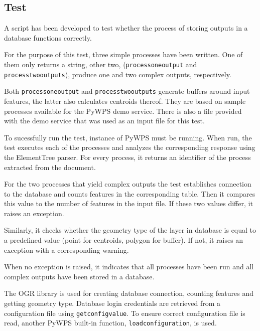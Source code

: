 \subsection{Test} 

A script has been developed to test whether the process of storing outputs in a database functions correctly.

For the purpose of this test, three simple processes have been written. One of them only returns a string, other two, (\texttt{process\textunderscore one\textunderscore output} and \texttt{process\textunderscore two\textunderscore outputs}), produce one and two complex outputs, respectively. 

Both \texttt{process\textunderscore one\textunderscore output} and \texttt{process\textunderscore two\textunderscore outputs} generate buffers around input features, the latter also calculates centroids thereof. They are based on sample processes available for the PyWPS demo service. There is also a  file provided with the demo service that was used as an input file for this test.  

To sucessfully run the test, instance of PyWPS must be running. When run, the test executes each of the processes and analyzes the corresponding  response using the ElementTree  parser. For every process, it returns an identifier of the process extracted from the  document. 

For the two processes that yield complex outputs the test establishes connection to the database and counts features in the corresponding table. Then it compares this value to the number of features in the input file. If these two values differ, it raises an exception.

Similarly, it checks whether the geometry type of the layer in database is equal to a predefined value (point for centroids, polygon for buffer). If not, it raises an exception with a corresponding warning. 

When no exception is raised, it indicates that all processes have been run and all complex outputs have been stored in a database.

The OGR library is used for creating database connection, counting features and getting geometry type. Database login credentials are retrieved from a configuration file using \texttt{get\textunderscore config\textunderscore value}. To ensure correct configuration file is read, another PyWPS built-in function, \texttt{load\textunderscore configuration}, is used.







